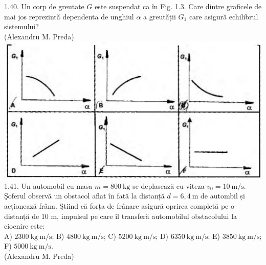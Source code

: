 \documentclass[10pt]{article}
\begin{document}
1.40. Un corp de greutate $G$ este suspendat ca în Fig. 1.3. Care dintre graficele de mai jos reprezintă dependenta de unghiul $\alpha$ a greutății $G_{1}$ care asigură echilibrul sistemului?\\ (Alexandru M. Preda)\\ \includegraphics[max width=\textwidth, center]{2025_07_01_5b3ff9fa0d508c8e9f17g-011(2)}\\

1.41. Un automobil cu masa $m=800 \mathrm{~kg}$ se deplasează cu viteza $v_{0}=10 \mathrm{~m} / \mathrm{s}$. Şoferul observă un obstacol aflat în față la distanță $d=6,4 \mathrm{~m}$ de autombil și acționează frâna. Ştiind că forța de frânare asigură oprirea completă pe o distanță de 10 m, impulsul pe care îl transferă automobilul obstacolului la ciocnire este:\\ A) $2300 \mathrm{~kg} \mathrm{~m} / \mathrm{s}$; B) $4800 \mathrm{~kg} \mathrm{~m} / \mathrm{s}$; C) $5200 \mathrm{~kg} \mathrm{~m} / \mathrm{s}$; D) $6350 \mathrm{~kg} \mathrm{~m} / \mathrm{s}$; E) $3850 \mathrm{~kg} \mathrm{~m} / \mathrm{s}$; F) $5000 \mathrm{~kg} \mathrm{~m} / \mathrm{s}$.\\ (Alexandru M. Preda)\\
\end{document}
